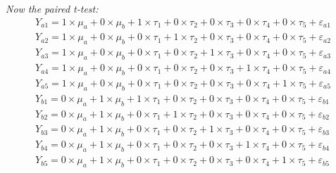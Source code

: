 \documentclass[a4paper,10pt]{article}
\begin{document}
\bigskip
\textit{Now the paired t-test:}
\begin{align*}
Y_{a1} = 1 \times \mu_{a} + 0 \times \mu_{b} + 1 \times \tau_{1} + 0 \times \tau_{2} + 0 \times \tau_{3} + 0 \times \tau_{4} + 0 \times \tau_{5} + \varepsilon_{a1} \\ 
Y_{a2} = 1 \times \mu_{a} + 0 \times \mu_{b} + 0 \times \tau_{1} + 1 \times \tau_{2} + 0 \times \tau_{3} +  0 \times \tau_{4} + 0 \times \tau_{5} + \varepsilon_{a2} \\  
Y_{a3} = 1 \times \mu_{a} + 0 \times \mu_{b} + 0 \times \tau_{1} + 0 \times \tau_{2} + 1 \times \tau_{3} +  0 \times \tau_{4} + 0 \times \tau_{5} + \varepsilon_{a3} \\ 
Y_{a4} = 1 \times \mu_{a} + 0 \times \mu_{b} + 0 \times \tau_{1} + 0 \times \tau_{2} + 0 \times \tau_{3} +  1 \times \tau_{4} + 0 \times \tau_{5} +  \varepsilon_{a4} \\  
Y_{a5} = 1 \times \mu_{a} + 0 \times \mu_{b} + 0 \times \tau_{1} + 0 \times \tau_{2} + 0 \times \tau_{3} +  0 \times \tau_{4} + 1 \times \tau_{5} +  \varepsilon_{a5} \\ 
%
Y_{b1} = 0 \times \mu_{a} + 1 \times \mu_{b} + 1 \times \tau_{1} + 0 \times \tau_{2} + 0 \times \tau_{3} +  0 \times \tau_{4} + 0 \times \tau_{5} +  \varepsilon_{b1} \\  
Y_{b2} = 0 \times \mu_{a} + 1 \times \mu_{b} + 0 \times \tau_{1} + 1 \times \tau_{2} + 0 \times \tau_{3} +  0 \times \tau_{4} + 0 \times \tau_{5} +  \varepsilon_{b2} \\  
Y_{b3} = 0 \times \mu_{a} + 1 \times \mu_{b} + 0 \times \tau_{1} + 0 \times \tau_{2} + 1 \times \tau_{3} +  0 \times \tau_{4} + 0 \times \tau_{5} +  \varepsilon_{b3} \\ 
Y_{b4} = 0 \times \mu_{a} + 1 \times \mu_{b} + 0 \times \tau_{1} + 0 \times \tau_{2} + 0 \times \tau_{3} +  1 \times \tau_{4} + 0 \times \tau_{5} +  \varepsilon_{b4} \\  
Y_{b5} = 0 \times \mu_{a} + 1 \times \mu_{b} + 0 \times \tau_{1} + 0 \times \tau_{2} + 0 \times \tau_{3} +  0 \times \tau_{4} + 1 \times \tau_{5} +  \varepsilon_{b5} \\ 
\end{align*}
\end{document}
